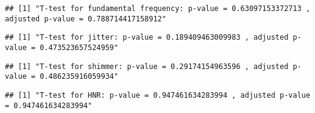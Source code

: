 \documentclass[
]{article}
\newenvironment{Shaded}{\begin{snugshade}}{\end{snugshade}}
\newcommand{\DecValTok}[1]{\textcolor[rgb]{0.00,0.00,0.81}{#1}}
\newcommand{\FunctionTok}[1]{\textcolor[rgb]{0.00,0.00,0.00}{#1}}
\newcommand{\NormalTok}[1]{#1}
\newcommand{\SpecialCharTok}[1]{\textcolor[rgb]{0.00,0.00,0.00}{#1}}
\newcommand{\StringTok}[1]{\textcolor[rgb]{0.31,0.60,0.02}{#1}}
\begin{document}
\begin{verbatim}
## [1] "T-test for fundamental frequency: p-value = 0.63097153372713 , adjusted p-value = 0.788714417158912"
\end{verbatim}

\begin{Shaded}
\end{Shaded}

\begin{verbatim}
## [1] "T-test for jitter: p-value = 0.189409463009983 , adjusted p-value = 0.473523657524959"
\end{verbatim}

\begin{Shaded}
\end{Shaded}

\begin{verbatim}
## [1] "T-test for shimmer: p-value = 0.29174154963596 , adjusted p-value = 0.486235916059934"
\end{verbatim}

\begin{Shaded}
\end{Shaded}

\begin{verbatim}
## [1] "T-test for HNR: p-value = 0.947461634283994 , adjusted p-value = 0.947461634283994"
\end{verbatim}
\end{document}
